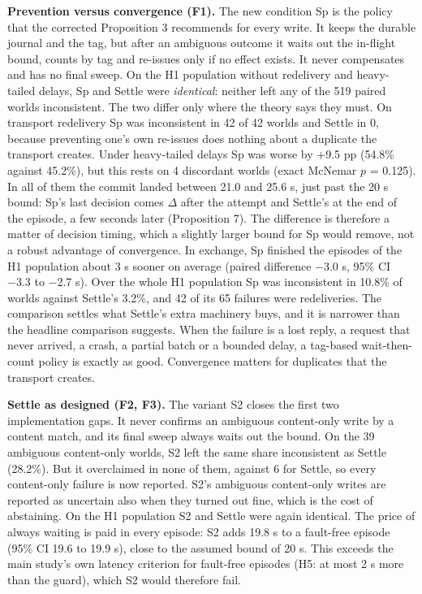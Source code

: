 \documentclass[
  10pt,
]{article}
\begin{document}
\textbf{Prevention versus convergence (F1).} The new condition Sp is the
policy that the corrected Proposition 3 recommends for every write. It
keeps the durable journal and the tag, but after an ambiguous outcome it
waits out the in-flight bound, counts by tag and re-issues only if no
effect exists. It never compensates and has no final sweep. On the H1
population without redelivery and heavy-tailed delays, Sp and Settle
were \emph{identical}: neither left any of the 519 paired worlds
inconsistent. The two differ only where the theory says they must. On
transport redelivery Sp was inconsistent in 42 of 42 worlds and Settle
in 0, because preventing one's own re-issues does nothing about a
duplicate the transport creates. Under heavy-tailed delays Sp was worse
by +9.5 pp (54.8\% against 45.2\%), but this rests on 4 discordant
worlds (exact McNemar \(p\) = 0.125). In all of them the commit landed
between 21.0 and 25.6 s, just past the 20 s bound: Sp's last decision
comes \(\Delta\) after the attempt and Settle's at the end of the
episode, a few seconds later (Proposition 7). The difference is
therefore a matter of decision timing, which a slightly larger bound for
Sp would remove, not a robust advantage of convergence. In exchange, Sp
finished the episodes of the H1 population about 3 s sooner on average
(paired difference −3.0 s, 95\% CI −3.3 to −2.7 s). Over the whole H1
population Sp was inconsistent in 10.8\% of worlds against Settle's
3.2\%, and 42 of its 65 failures were redeliveries. The comparison
settles what Settle's extra machinery buys, and it is narrower than the
headline comparison suggests. When the failure is a lost reply, a
request that never arrived, a crash, a partial batch or a bounded delay,
a tag-based wait-then-count policy is exactly as good. Convergence
matters for duplicates that the transport creates.

\textbf{Settle as designed (F2, F3).} The variant S2 closes the first
two implementation gaps. It never confirms an ambiguous content-only
write by a content match, and its final sweep always waits out the
bound. On the 39 ambiguous content-only worlds, S2 left the same share
inconsistent as Settle (28.2\%). But it overclaimed in none of them,
against 6 for Settle, so every content-only failure is now reported.
S2's ambiguous content-only writes are reported as uncertain also when
they turned out fine, which is the cost of abstaining. On the H1
population S2 and Settle were again identical. The price of always
waiting is paid in every episode: S2 adds 19.8 s to a fault-free episode
(95\% CI 19.6 to 19.9 s), close to the assumed bound of 20 s. This
exceeds the main study's own latency criterion for fault-free episodes
(H5: at most 2 s more than the guard), which S2 would therefore fail.
\end{document}
